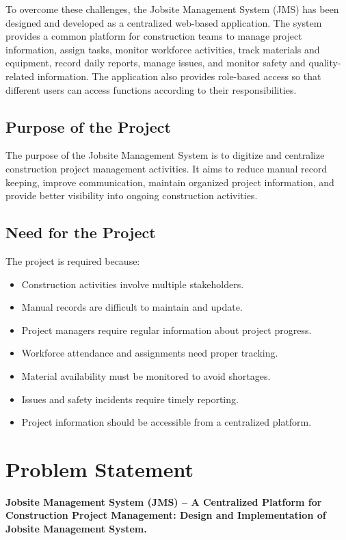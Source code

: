 \documentclass[11pt,a4paper]{article}
\begin{document}
To overcome these challenges, the Jobsite Management System (JMS) has been designed and developed as a centralized web-based application. The system provides a common platform for construction teams to manage project information, assign tasks, monitor workforce activities, track materials and equipment, record daily reports, manage issues, and monitor safety and quality-related information. The application also provides role-based access so that different users can access functions according to their responsibilities.

\subsection{Purpose of the Project}
The purpose of the Jobsite Management System is to digitize and centralize construction project management activities. It aims to reduce manual record keeping, improve communication, maintain organized project information, and provide better visibility into ongoing construction activities.

\subsection{Need for the Project}
The project is required because:
\begin{itemize}
\item Construction activities involve multiple stakeholders.
\item Manual records are difficult to maintain and update.
\item Project managers require regular information about project progress.
\item Workforce attendance and assignments need proper tracking.
\item Material availability must be monitored to avoid shortages.
\item Issues and safety incidents require timely reporting.
\item Project information should be accessible from a centralized platform.
\end{itemize}

\section{Problem Statement}
\textbf{Jobsite Management System (JMS) -- A Centralized Platform for Construction Project Management: Design and Implementation of Jobsite Management System.}
\end{document}
